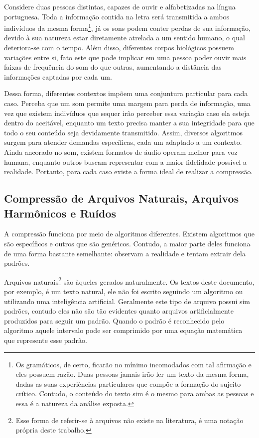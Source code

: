 \hspace{1.5 cm} Considere duas pessoas distintas, capazes de ouvir e alfabetizadas na língua portuguesa. Toda a informação contida na letra será transmitida a ambos indivíduos da mesma forma\footnote{Os gramáticos, de certo, ficarão no mínimo incomodados com tal afirmação e eles possuem razão. Duas pessoas jamais irão ler um texto da mesma forma, dadas as suas experiências particulares que compõe a formação do sujeito crítico. Contudo, o conteúdo do texto sim é o mesmo para ambas as pessoas e essa é a natureza da análise exposta.}, já os sons podem conter perdas de sua informação, devido à sua natureza estar diretamente atrelada a um sentido humano, o qual deteriora-se com o tempo. Além disso, diferentes corpos biológicos possuem variações entre si, fato este que pode implicar em uma pessoa poder ouvir mais faixas de frequência do som do que outras, aumentando a distância das informações captadas por cada um.

\hspace{1.5 cm} Dessa forma, diferentes contextos impõem uma conjuntura particular para cada caso. Perceba que um som permite uma margem para perda de informação, uma vez que existem indivíduos que sequer irão perceber essa variação caso ela esteja dentro do aceitável, enquanto um texto precisa manter a sua integridade para que todo o seu conteúdo seja devidamente transmitido. Assim, diversos algoritmos surgem para atender demandas específicas, cada um adaptado a um contexto. Ainda ancorado no som, existem formatos de áudio operam melhor para voz humana, enquanto outros buscam representar com a maior fidelidade possível a realidade. Portanto, para cada caso existe a forma ideal de realizar a compressão. 

\subsection{Compressão de Arquivos Naturais, Arquivos Harmônicos e Ruídos}
A compressão funciona por meio de algoritmos diferentes. Existem algoritmos que são específicos e outros que são genéricos. Contudo, a maior parte deles funciona de uma forma bastante semelhante: observam a realidade e tentam extrair dela padrões.

\hspace{1.5 cm} Arquivos naturais\footnote{Esse forma de referir-se à arquivos não existe na literatura, é uma notação própria deste trabalho.} são àqueles gerados naturalmente. Os textos deste documento, por exemplo, é um texto natural, ele não foi escrito seguindo um algoritmo ou utilizando uma inteligência artificial. Geralmente este tipo de arquivo possui sim padrões, contudo eles não são tão evidentes quanto arquivos artificialmente produzidos para seguir um padrão. Quando o padrão é reconhecido pelo algoritmo aquele intervalo pode ser comprimido por uma equação matemática que represente esse padrão.


